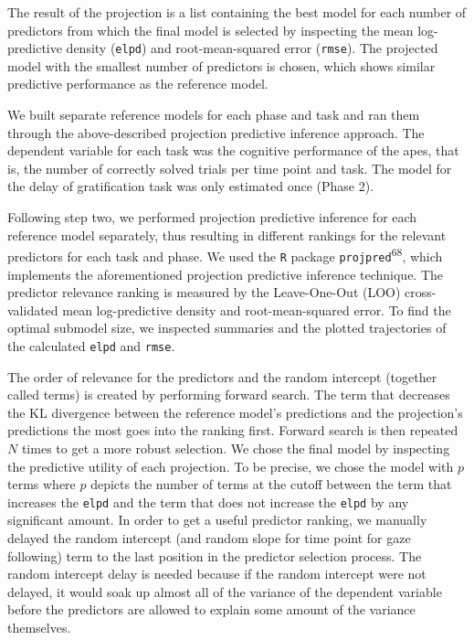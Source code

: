 \documentclass[
  man,floatsintext]{apa6}
\begin{document}
The result of the projection is a list containing the best model for each number of predictors from which the final model is selected by inspecting the mean log-predictive density (\texttt{elpd}) and root-mean-squared error (\texttt{rmse}). The projected model with the smallest number of predictors is chosen, which shows similar predictive performance as the reference model.

We built separate reference models for each phase and task and ran them through the above-described projection predictive inference approach. The dependent variable for each task was the cognitive performance of the apes, that is, the number of correctly solved trials per time point and task. The model for the delay of gratification task was only estimated once (Phase 2).

Following step two, we performed projection predictive inference for each reference model separately, thus resulting in different rankings for the relevant predictors for each task and phase. We used the \texttt{R} package \texttt{projpred}\textsuperscript{68}, which implements the aforementioned projection predictive inference technique. The predictor relevance ranking is measured by the Leave-One-Out (LOO) cross-validated mean log-predictive density and root-mean-squared error. To find the optimal submodel size, we inspected summaries and the plotted trajectories of the calculated \texttt{elpd} and \texttt{rmse}.

The order of relevance for the predictors and the random intercept (together called terms) is created by performing forward search. The term that decreases the KL divergence between the reference model's predictions and the projection's predictions the most goes into the ranking first. Forward search is then repeated \(N\) times to get a more robust selection. We chose the final model by inspecting the predictive utility of each projection. To be precise, we chose the model with \(p\) terms where \(p\) depicts the number of terms at the cutoff between the term that increases the \texttt{elpd} and the term that does not increase the \texttt{elpd} by any significant amount. In order to get a useful predictor ranking, we manually delayed the random intercept (and random slope for time point for gaze following) term to the last position in the predictor selection process. The random intercept delay is needed because if the random intercept were not delayed, it would soak up almost all of the variance of the dependent variable before the predictors are allowed to explain some amount of the variance themselves.
\end{document}
